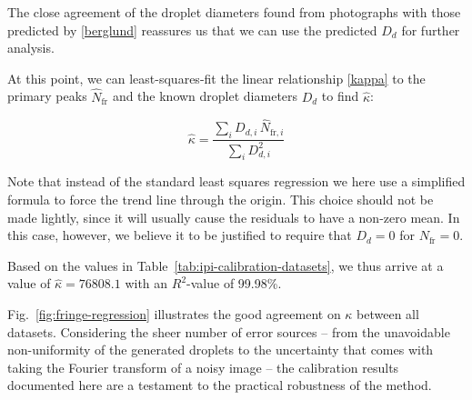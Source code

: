 \documentclass[11.5pt]{book}
\newcommand*{\figref}[1]{Fig.~\ref{#1}}
\newcommand*{\tableref}[1]{Table~\ref{#1}}
\begin{document}
The close agreement of the droplet diameters found from photographs with those
predicted by \eqref{berglund} reassures us that we can use the predicted $D_d$
for further analysis.

At this point, we can least-squares-fit the linear relationship \eqref{kappa} to the primary
peaks $\hat{N}_\text{fr}$ and the known droplet diameters $D_d$ to find
$\hat{\kappa}$:

\begin{equation}
    \hat{\kappa} = \frac{\sum_i D_{d,i} \, \hat{N}_{\text{fr}, i}}{\sum_i
    D_{d,i}^2}
\end{equation}

Note that instead of the standard least squares regression we here use a
simplified formula to force the trend line through the origin. This choice
should not be made lightly, since it will usually cause the residuals to have a
non-zero mean. In this case, however, we believe it to be justified to require
that $D_d = 0$ for $N_\text{fr} = 0$.

Based on the values in \tableref{tab:ipi-calibration-datasets}, we thus arrive
at a value of $\hat{\kappa} = 76808.1$ with an $R^2$-value of 99.98\%. 

\figref{fig:fringe-regression} illustrates the good agreement on $\kappa$ between
all datasets. Considering the sheer number of error sources -- from the
unavoidable non-uniformity of the generated droplets to the uncertainty that
comes with taking the Fourier transform of a noisy image -- the calibration
results documented here are a testament to the practical robustness of the
method.
\end{document}
